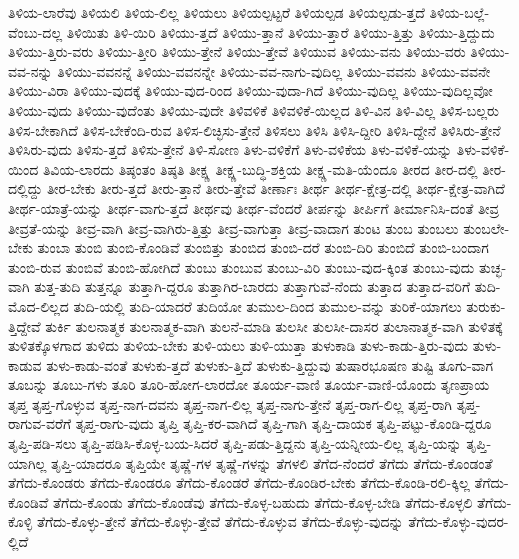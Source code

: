 {ತಿಳಿಯ-ಲಾರೆವು
ತಿಳಿಯಲಿ
ತಿಳಿಯ-ಲಿಲ್ಲ
ತಿಳಿಯಲು
ತಿಳಿಯಲ್ಪಟ್ಟರೆ
ತಿಳಿಯಲ್ಪಡ
ತಿಳಿಯಲ್ಪಡು-ತ್ತದೆ
ತಿಳಿಯ-ಬಲ್ಲೆ-ವೆಂಬು-ದಲ್ಲ
ತಿಳಿಯಿತು
ತಿಳಿ-ಯಿರಿ
ತಿಳಿಯು-ತ್ತದೆ
ತಿಳಿಯು-ತ್ತಾನೆ
ತಿಳಿಯು-ತ್ತಾರೆ
ತಿಳಿಯು-ತ್ತಿತ್ತು
ತಿಳಿಯು-ತ್ತಿದ್ದುದು
ತಿಳಿಯು-ತ್ತಿರು-ವರು
ತಿಳಿಯು-ತ್ತೀರಿ
ತಿಳಿಯು-ತ್ತೇನೆ
ತಿಳಿಯು-ತ್ತೇವೆ
ತಿಳಿಯುವ
ತಿಳಿಯು-ವನು
ತಿಳಿಯು-ವರು
ತಿಳಿಯು-ವವ-ನನ್ನು
ತಿಳಿಯು-ವವನನ್ನೆ
ತಿಳಿಯು-ವವನನ್ನೇ
ತಿಳಿಯು-ವವ-ನಾಗು-ವುದಿಲ್ಲ
ತಿಳಿಯು-ವವನು
ತಿಳಿಯು-ವವನೇ
ತಿಳಿಯು-ವಿರಾ
ತಿಳಿಯು-ವುದಕ್ಕೆ
ತಿಳಿಯು-ವುದ-ರಿಂದ
ತಿಳಿಯು-ವುದಾ-ಗಿದೆ
ತಿಳಿಯು-ವುದಿಲ್ಲ
ತಿಳಿಯು-ವುದಿಲ್ಲವೋ
ತಿಳಿಯು-ವುದು
ತಿಳಿಯು-ವುದೆಂತು
ತಿಳಿಯು-ವುದೇ
ತಿಳಿವಳಿಕೆ
ತಿಳಿವಳಿಕೆ-ಯಿಲ್ಲದ
ತಿಳಿ-ವಿನ
ತಿಳಿ-ವಿಲ್ಲ
ತಿಳಿಸ-ಬಲ್ಲರು
ತಿಳಿಸ-ಬೇಕಾಗಿದೆ
ತಿಳಿಸ-ಬೇಕೆಂದಿ-ರುವ
ತಿಳಿಸ-ಲಿಚ್ಛಿಸು-ತ್ತೇನೆ
ತಿಳಿಸಲು
ತಿಳಿಸಿ
ತಿಳಿಸಿ-ದ್ದೀರಿ
ತಿಳಿಸಿ-ದ್ದೇನೆ
ತಿಳಿಸಿರು-ತ್ತೇನೆ
ತಿಳಿಸಿರು-ವುದು
ತಿಳಿಸು-ತ್ತದೆ
ತಿಳಿಸು-ತ್ತೇನೆ
ತಿಳಿ-ಸೋಣ
ತಿಳು-ವಳಿಕೆಗೆ
ತಿಳು-ವಳಿಕೆಯ
ತಿಳು-ವಳಿಕೆ-ಯನ್ನು
ತಿಳು-ವಳಿಕೆ-ಯಿಂದ
ತಿವಿಯ-ಲಾರದು
ತಿಷ್ಠಂತಂ
ತಿಷ್ಠತಿ
ತೀಕ್ಷ್ಣ
ತೀಕ್ಷ್ಣ-ಬುದ್ಧಿ-ಶಕ್ತಿಯ
ತೀಕ್ಷ್ಣ-ಮತಿ-ಯೆಂದೂ
ತೀರದ
ತೀರ-ದಲ್ಲಿ
ತೀರ-ದಲ್ಲಿದ್ದು
ತೀರ-ಬೇಕು
ತೀರು-ತ್ತದೆ
ತೀರು-ತ್ತಾನೆ
ತೀರು-ತ್ತೇವೆ
ತೀರ್ಣಾಃ
ತೀರ್ಥ
ತೀರ್ಥ-ಕ್ಷೇತ್ರ-ದಲ್ಲಿ
ತೀರ್ಥ-ಕ್ಷೇತ್ರ-ವಾಗಿದೆ
ತೀರ್ಥ-ಯಾತ್ರೆ-ಯನ್ನು
ತೀರ್ಥ-ವಾಗು-ತ್ತದೆ
ತೀರ್ಥವು
ತೀರ್ಥ-ವೆಂದರೆ
ತೀರ್ಪನ್ನು
ತೀರ್ಪಿಗೆ
ತೀರ್ಮಾನಿಸಿ-ದಂತೆ
ತೀವ್ರ
ತೀವ್ರತೆ-ಯನ್ನು
ತೀವ್ರ-ವಾಗಿ
ತೀವ್ರ-ವಾಗಿರು-ತ್ತಿತ್ತು
ತೀವ್ರ-ವಾಗುತ್ತಾ
ತೀವ್ರ-ವಾದಾಗ
ತುಂಟ
ತುಂಬ
ತುಂಬಲು
ತುಂಬಲೇ-ಬೇಕು
ತುಂಬಾ
ತುಂಬಿ
ತುಂಬಿ-ಕೊಂಡಿವೆ
ತುಂಬಿತ್ತು
ತುಂಬಿದ
ತುಂಬಿ-ದರೆ
ತುಂಬಿ-ದಿರಿ
ತುಂಬಿದೆ
ತುಂಬಿ-ಬಂದಾಗ
ತುಂಬಿ-ರುವ
ತುಂಬಿವೆ
ತುಂಬಿ-ಹೋಗಿದೆ
ತುಂಬು
ತುಂಬುವ
ತುಂಬು-ವಿರಿ
ತುಂಬು-ವುದ-ಕ್ಕಿಂತ
ತುಂಬು-ವುದು
ತುಚ್ಛ-ವಾಗಿ
ತುತ್ತ-ತುದಿ
ತುತ್ತನ್ನೂ
ತುತ್ತಾಗಿ-ದ್ದರೂ
ತುತ್ತಾಗಿರ-ಬಾರದು
ತುತ್ತಾಗುವೆ-ನೆಂದು
ತುತ್ತಾದ
ತುತ್ತಾದ-ವರಿಗೆ
ತುದಿ-ಮೊದ-ಲಿಲ್ಲದ
ತುದಿ-ಯಲ್ಲಿ
ತುದಿ-ಯಾದರೆ
ತುದಿಯೋ
ತುಮುಲ-ದಿಂದ
ತುಮುಲ-ವನ್ನು
ತುರಿಕೆ-ಯಾಗಲು
ತುರುಕು-ತ್ತಿದ್ದೇವೆ
ತುರ್ಕಿ
ತುಲನಾತ್ಮಕ
ತುಲನಾತ್ಮಕ-ವಾಗಿ
ತುಲನೆ-ಮಾಡಿ
ತುಲಸೀ
ತುಲಸೀ-ದಾಸರ
ತುಲಾನಾತ್ಮಕ-ವಾಗಿ
ತುಳಿತಕ್ಕೆ
ತುಳಿತಕ್ಕೊಳಗಾದ
ತುಳಿದು
ತುಳಿಯ-ಬೇಕು
ತುಳಿ-ಯಲು
ತುಳಿ-ಯುತ್ತಾ
ತುಳುಕಾಡಿ
ತುಳು-ಕಾಡು-ತ್ತಿರು-ವುದು
ತುಳು-ಕಾಡುವ
ತುಳು-ಕಾಡು-ವಂತೆ
ತುಳುಕು-ತ್ತದೆ
ತುಳುಕು-ತ್ತಿದೆ
ತುಳುಕು-ತ್ತಿದ್ದುವು
ತುಷಾರಭೂಷಣ
ತುಷ್ಟಿ
ತೂಗು-ವಾಗ
ತೂಬನ್ನು
ತೂಬು-ಗಳು
ತೂರಿ
ತೂರಿ-ಹೋಗ-ಲಾರದೋ
ತೂರ್ಯ-ವಾಣಿ
ತೂರ್ಯ-ವಾಣಿ-ಯೊಂದು
ತೃಣಪ್ರಾಯ
ತೃಪ್ತ
ತೃಪ್ತ-ಗೊಳ್ಳುವ
ತೃಪ್ತ-ನಾಗ-ದವನು
ತೃಪ್ತ-ನಾಗ-ಲಿಲ್ಲ
ತೃಪ್ತ-ನಾಗು-ತ್ತೇನೆ
ತೃಪ್ತ-ರಾಗ-ಲಿಲ್ಲ
ತೃಪ್ತ-ರಾಗಿ
ತೃಪ್ತ-ರಾಗುವ-ವರೆಗೆ
ತೃಪ್ತ-ರಾಗು-ವುದು
ತೃಪ್ತಿ
ತೃಪ್ತಿ-ಕರ-ವಾಗಿದೆ
ತೃಪ್ತಿ-ಗಾಗಿ
ತೃಪ್ತಿ-ದಾಯಕ
ತೃಪ್ತಿ-ಪಟ್ಟು-ಕೊಂಡಿ-ದ್ದರೂ
ತೃಪ್ತಿ-ಪಡಿ-ಸಲು
ತೃಪ್ತಿ-ಪಡಿಸಿ-ಕೊಳ್ಳ-ಬಯ-ಸಿದರೆ
ತೃಪ್ತಿ-ಪಡು-ತ್ತಿದ್ದನು
ತೃಪ್ತಿ-ಯನ್ನೀಯ-ಲಿಲ್ಲ
ತೃಪ್ತಿ-ಯನ್ನು
ತೃಪ್ತಿ-ಯಾಗಿಲ್ಲ
ತೃಪ್ತಿ-ಯಾದರೂ
ತೃಪ್ತಿಯೇ
ತೃಷ್ಣೆ-ಗಳ
ತೃಷ್ಣೆ-ಗಳನ್ನು
ತೆಗಳಲಿ
ತೆಗೆದ-ನೆಂದರೆ
ತೆಗೆದು
ತೆಗೆದು-ಕೊಂಡಂತೆ
ತೆಗೆದು-ಕೊಂಡರು
ತೆಗೆದು-ಕೊಂಡರೂ
ತೆಗೆದು-ಕೊಂಡರೆ
ತೆಗೆದು-ಕೊಂಡಿರ-ಬೇಕು
ತೆಗೆದು-ಕೊಂಡಿ-ರಲಿ-ಕ್ಕಿಲ್ಲ
ತೆಗೆದು-ಕೊಂಡಿವೆ
ತೆಗೆದು-ಕೊಂಡು
ತೆಗೆದು-ಕೊಂಡೆವು
ತೆಗೆದು-ಕೊಳ್ಳ-ಬಹುದು
ತೆಗೆದು-ಕೊಳ್ಳ-ಬೇಡಿ
ತೆಗೆದು-ಕೊಳ್ಳಲಿ
ತೆಗೆದು-ಕೊಳ್ಳಿ
ತೆಗೆದು-ಕೊಳ್ಳು-ತ್ತೇನೆ
ತೆಗೆದು-ಕೊಳ್ಳು-ತ್ತೇವೆ
ತೆಗೆದು-ಕೊಳ್ಳುವ
ತೆಗೆದು-ಕೊಳ್ಳು-ವುದನ್ನು
ತೆಗೆದು-ಕೊಳ್ಳು-ವುದರ-ಲ್ಲಿದೆ
}
